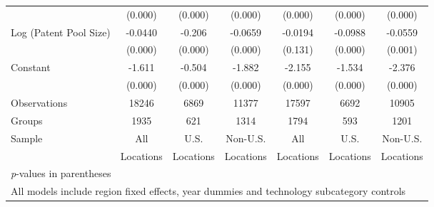 \begin{table}[htbp]
\begin{tabular}{l*{6}{c}}
                &  (0.000)&  (0.000)&  (0.000)&  (0.000)&  (0.000)&  (0.000)\\
Log (Patent Pool Size)&  -0.0440&   -0.206&  -0.0659&  -0.0194&  -0.0988&  -0.0559\\
                &  (0.000)&  (0.000)&  (0.000)&  (0.131)&  (0.000)&  (0.001)\\
Constant        &   -1.611&   -0.504&   -1.882&   -2.155&   -1.534&   -2.376\\
                &  (0.000)&  (0.000)&  (0.000)&  (0.000)&  (0.000)&  (0.000)\\
\hline
Observations    &    18246&     6869&    11377&    17597&     6692&    10905\\
Groups          &     1935&      621&     1314&     1794&      593&     1201\\
Sample&All &U.S. &Non-U.S.&All &U.S. &Non-U.S. \\
          &Locations &Locations&Locations&Locations &Locations&Locations \\\hline\hline
\multicolumn{7}{l}{\footnotesize \textit{p}-values in parentheses}\\
\multicolumn{7}{l}{\footnotesize All models include region fixed effects, year dummies and technology subcategory controls}\\
\end{tabular}
\end{table}
